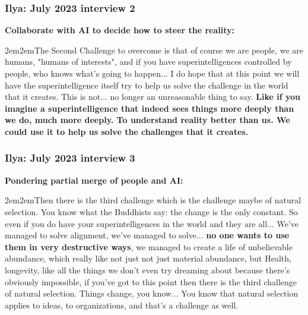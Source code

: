 \documentclass{beamer}
\newenvironment{customquote}
  {\begin{adjustwidth}{2em}{2em}\noindent\textnormal}
  {\end{adjustwidth}}
\begin{document}
\begin{frame}

  \frametitle{Ilya: July 2023 interview 2}

{\bf Collaborate with AI to decide how to steer the reality:}\\[2ex]

\begin{customquote}
The Second Challenge to overcome is that of course we are people, we are humans, "humans of interests", and if you have superintelligences controlled by people, who knows what's going to happen... I do hope that at this point we will have the superintelligence itself try to help us solve the challenge in the world that it creates. This is not... no longer an unreasonable thing to say. {\bf Like if you imagine a superintelligence that indeed sees things more deeply than we do, much more deeply. To understand reality better than us. We could use it to help us solve the challenges that it creates.}\\[2ex]
\end{customquote}

\end{frame}

\begin{frame}

  \frametitle{Ilya: July 2023 interview 3}

{\bf Pondering partial merge of people and AI:}\\[2ex]

\begin{customquote}
Then there is the third challenge which is the challenge maybe of natural selection. You know what the Buddhists say: the change is the only constant. So even if you do have your superintelligences in the world and they are all... We've managed to solve alignment, we've managed to solve... {\bf no one wants to use them in very destructive ways}, we managed to create a life of unbelievable abundance, which really like not just not just material abundance, but Health, longevity, like all the things we don't even try dreaming about because there's obviously impossible, if you've got to this point then there is the third challenge of natural selection. Things change, you know... You know that natural selection applies to ideas, to organizations, and that's a challenge as well.
\end{customquote}

\end{frame}
\end{document}

